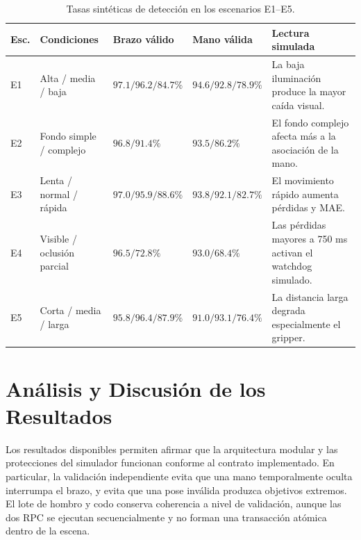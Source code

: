 \begin{table}[H]
    \centering
    \renewcommand{\arraystretch}{1.2}
    \small
    \begin{tabularx}{\textwidth}{p{1.2cm} p{3.3cm} p{2.4cm} p{2.4cm} X}
        \toprule
        \textbf{Esc.} & \textbf{Condiciones} & \textbf{Brazo válido} &
        \textbf{Mano válida} & \textbf{Lectura simulada} \\
        \midrule
        E1 & Alta / media / baja &
        $97.1 / 96.2 / 84.7\%$ & $94.6 / 92.8 / 78.9\%$ &
        La baja iluminación produce la mayor caída visual. \\
        E2 & Fondo simple / complejo &
        $96.8 / 91.4\%$ & $93.5 / 86.2\%$ &
        El fondo complejo afecta más a la asociación de la mano. \\
        E3 & Lenta / normal / rápida &
        $97.0 / 95.9 / 88.6\%$ & $93.8 / 92.1 / 82.7\%$ &
        El movimiento rápido aumenta pérdidas y MAE. \\
        E4 & Visible / oclusión parcial &
        $96.5 / 72.8\%$ & $93.0 / 68.4\%$ &
        Las pérdidas mayores a 750 ms activan el watchdog simulado. \\
        E5 & Corta / media / larga &
        $95.8 / 96.4 / 87.9\%$ & $91.0 / 93.1 / 76.4\%$ &
        La distancia larga degrada especialmente el gripper. \\
        \bottomrule
    \end{tabularx}
    \caption{Tasas sintéticas de detección en los escenarios E1--E5.}
    \label{tab:robustez_simulada}
\end{table}

\section{Análisis y Discusión de los Resultados}
\label{sec:discusion_resultados}

Los resultados disponibles permiten afirmar que la arquitectura modular y las
protecciones del simulador funcionan conforme al contrato implementado. En
particular, la validación independiente evita que una mano temporalmente
oculta interrumpa el brazo, y evita que una pose inválida produzca objetivos
extremos. El lote de hombro y codo conserva coherencia a nivel de validación,
aunque las dos RPC se ejecutan secuencialmente y no forman una transacción
atómica dentro de la escena.

